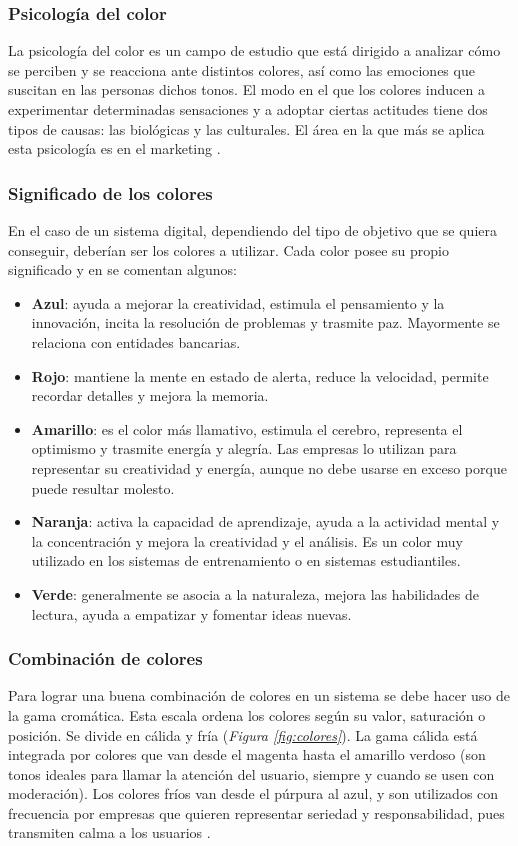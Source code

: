 \subsubsection{Psicología del color}
La psicología del color es un campo de estudio que está dirigido a analizar cómo se perciben y se reacciona ante distintos colores, así como las emociones que suscitan en las personas dichos tonos. El modo en el que los colores inducen a experimentar determinadas sensaciones y a adoptar ciertas actitudes tiene dos tipos de causas: las biológicas y las culturales. El área en la que más se aplica esta psicología es en el marketing \cite{Paspuezan2022}.

\subsubsection{Significado de los colores}
En el caso de un sistema digital, dependiendo del tipo de objetivo que se quiera conseguir, deberían ser los colores a utilizar. Cada color posee su propio significado y en \cite{TerronLopez2022} se comentan algunos:

\begin{itemize}
\item \textbf{Azul}: ayuda a mejorar la creatividad, estimula el pensamiento y la innovación, incita la resolución de problemas y trasmite paz. Mayormente se relaciona con entidades bancarias.
\item \textbf{Rojo}: mantiene la mente en estado de alerta, reduce la velocidad, permite recordar detalles y mejora la memoria.
\item \textbf{Amarillo}: es el color más llamativo, estimula el cerebro, representa el optimismo y trasmite energía y alegría. Las empresas lo utilizan para representar su creatividad y energía, aunque no debe usarse en exceso porque puede resultar molesto.
\item \textbf{Naranja}: activa la capacidad de aprendizaje, ayuda a la actividad mental y la concentración y mejora la creatividad y el análisis. Es un color muy utilizado en los sistemas de entrenamiento o en sistemas estudiantiles.
\item \textbf{Verde}: generalmente se asocia a la naturaleza, mejora las habilidades de lectura, ayuda a empatizar y fomentar ideas nuevas.
\end{itemize}

\subsubsection{Combinación de colores}
Para lograr una buena combinación de colores en un sistema se debe hacer uso de la gama cromática. Esta escala ordena los colores según su valor, saturación o posición. Se divide en cálida y fría (\textsl{Figura \ref{fig:colores}}). La gama cálida está integrada por colores que van desde el magenta hasta el amarillo verdoso (son tonos ideales para llamar la atención del usuario, siempre y cuando se usen con moderación). Los colores fríos van desde el púrpura al azul, y son utilizados con frecuencia por empresas que quieren representar seriedad y responsabilidad, pues transmiten calma a los usuarios \cite{TerronLopez2022} .

